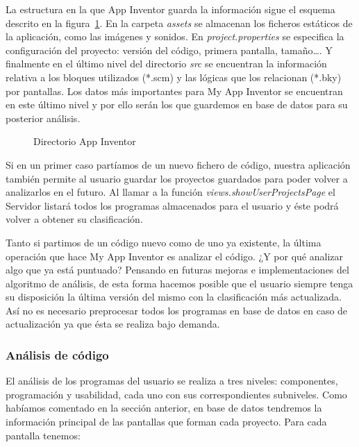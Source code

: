 \documentclass[a4paper, 12pt]{book}
\begin{document}
La estructura en la que App Inventor guarda la información sigue el esquema descrito en la figura~\ref{fig:dirappinventor}. En la carpeta \textit{assets} se almacenan los ficheros estáticos de la aplicación, como las imágenes y sonidos. En \textit{project.properties} se especifica la configuración del proyecto: versión del código, primera pantalla, tamaño\ldots. Y finalmente en el último nivel del directorio \textit{src} se encuentran la información relativa a los bloques utilizados (*.scm) y las lógicas que los relacionan (*.bky) por pantallas. Los datos más importantes para My App Inventor se encuentran en este último nivel y por ello serán los que guardemos en base de datos para su posterior análisis. 

\begin{figure}[H]
  \caption{Directorio App Inventor}
  \label{fig:dirappinventor}
\end{figure}

Si en un primer caso partíamos de un nuevo fichero de código, nuestra aplicación también permite al usuario guardar los proyectos guardados para poder volver a analizarlos en el futuro. Al llamar a la función \textit{views.showUserProjectsPage} el Servidor listará todos los programas almacenados para el usuario y éste podrá volver a obtener su clasificación. 

Tanto si partimos de un código nuevo como de uno ya existente, la última operación que hace My App Inventor es analizar el código. ¿Y por qué analizar algo que ya está puntuado? Pensando en futuras mejoras e implementaciones del algoritmo de análisis, de esta forma hacemos posible que el usuario siempre tenga su disposición la última versión del mismo con la clasificación más actualizada. Así no es necesario preprocesar todos los programas en base de datos en caso de actualización ya que ésta se realiza bajo demanda.

\subsubsection{Análisis de código}
El análisis de los programas del usuario se realiza a tres niveles: componentes, programación y usabilidad, cada uno con sus correspondientes subniveles. Como habíamos comentado en la sección anterior, en base de datos tendremos la información principal de las pantallas que forman cada proyecto. Para cada pantalla tenemos:
\end{document}
